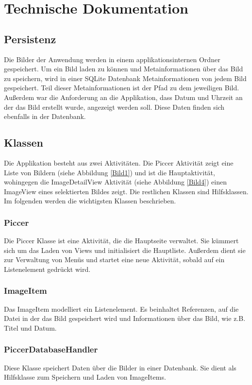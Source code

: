 \chapter{Technische Dokumentation}

\section{Persistenz}
Die Bilder der Anwendung werden in einem applikationsinternen Ordner gespeichert.
Um ein Bild laden zu können und Metainformationen über das Bild zu speichern,
wird in einer SQLite Datenbank Metainformationen von jedem Bild gespeichert.
Teil dieser Metainformationen ist der Pfad zu dem jeweiligen Bild.
Außerdem war die Anforderung an die Applikation, dass Datum und Uhrzeit an der das
Bild erstellt wurde, angezeigt werden soll.
Diese Daten finden sich ebenfalls in der Datenbank.

\section{Klassen}
Die Applikation besteht aus zwei Aktivitäten. 
Die Piccer Aktivität zeigt eine Liste von Bildern (siehe Abbildung \ref{Bild1}) und ist die Hauptaktivität,
wohingegen die ImageDetailView Aktivität (siehe Abbildung \ref{Bild4}) einen ImageView eines selektierten Bildes zeigt.
Die restlichen Klassen sind Hilfsklassen.
Im folgenden werden die wichtigsten Klassen beschrieben.

\subsection{Piccer}
Die Piccer Klasse ist eine Aktivität, die die Hauptseite verwaltet.
Sie kümmert sich um das Laden von Views und initialisiert die Hauptliste.
Außerdem dient sie zur Verwaltung von Menüs und startet eine neue Aktivität, sobald auf ein 
Listenelement gedrückt wird.

\subsection{ImageItem}
Das ImageItem modelliert ein Listenelement.
Es beinhaltet Referenzen, auf die Datei in der das Bild gespeichert wird
und Informationen über das Bild, wie z.B. Titel und Datum.

\subsection{PiccerDatabaseHandler}
Diese Klasse speichert Daten über die Bilder in einer Datenbank.
Sie dient als Hilfsklasse zum Speichern und Laden von ImageItems.

